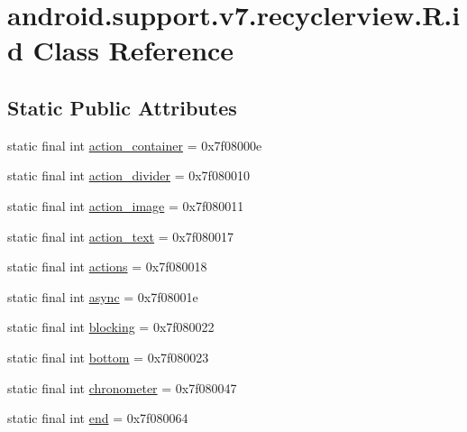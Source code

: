 \hypertarget{classandroid_1_1support_1_1v7_1_1recyclerview_1_1_r_1_1id}{}\section{android.\+support.\+v7.\+recyclerview.\+R.\+id Class Reference}
\label{classandroid_1_1support_1_1v7_1_1recyclerview_1_1_r_1_1id}
\subsection*{Static Public Attributes}
\begin{DoxyCompactItemize}
\item 
static final int \mbox{\hyperlink{classandroid_1_1support_1_1v7_1_1recyclerview_1_1_r_1_1id_a98a2b7ea76095687895566393269cfd3}{action\+\_\+container}} = 0x7f08000e
\item 
static final int \mbox{\hyperlink{classandroid_1_1support_1_1v7_1_1recyclerview_1_1_r_1_1id_a354e0bf2908e96cfc50a29d5ce3f4f72}{action\+\_\+divider}} = 0x7f080010
\item 
static final int \mbox{\hyperlink{classandroid_1_1support_1_1v7_1_1recyclerview_1_1_r_1_1id_a71f35fde98329ca524926b0644e02a39}{action\+\_\+image}} = 0x7f080011
\item 
static final int \mbox{\hyperlink{classandroid_1_1support_1_1v7_1_1recyclerview_1_1_r_1_1id_ac9d2ac0852b01922c9dab1db9ade8b94}{action\+\_\+text}} = 0x7f080017
\item 
static final int \mbox{\hyperlink{classandroid_1_1support_1_1v7_1_1recyclerview_1_1_r_1_1id_a67f1e1a5bbb0aac475662be50905c01e}{actions}} = 0x7f080018
\item 
static final int \mbox{\hyperlink{classandroid_1_1support_1_1v7_1_1recyclerview_1_1_r_1_1id_aba31688e330c70179c23baf171031cc9}{async}} = 0x7f08001e
\item 
static final int \mbox{\hyperlink{classandroid_1_1support_1_1v7_1_1recyclerview_1_1_r_1_1id_a696dbf3e7b2a019f9bcb9bf3e3ec2e55}{blocking}} = 0x7f080022
\item 
static final int \mbox{\hyperlink{classandroid_1_1support_1_1v7_1_1recyclerview_1_1_r_1_1id_a1bce7d92a856358ceef47565628a7c93}{bottom}} = 0x7f080023
\item 
static final int \mbox{\hyperlink{classandroid_1_1support_1_1v7_1_1recyclerview_1_1_r_1_1id_a84b100c0a11d127af280351cad812067}{chronometer}} = 0x7f080047
\item 
static final int \mbox{\hyperlink{classandroid_1_1support_1_1v7_1_1recyclerview_1_1_r_1_1id_a2d1e61b70640c92e031e0fb1cfa6712b}{end}} = 0x7f080064

\end{DoxyCompactItemize}
